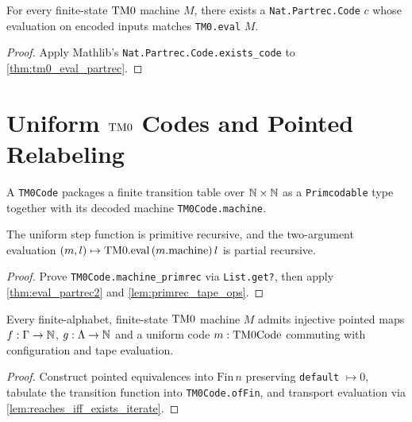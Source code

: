 \begin{corollary}
  \label{cor:exists_code_eval}
  \leanok
  For every finite-state $\mathrm{TM0}$ machine $M$, there exists a \texttt{Nat.Partrec.Code} $c$ whose evaluation on encoded inputs matches \texttt{TM0.eval} $M$.
\end{corollary}
\begin{proof}
  \leanok
  Apply Mathlib's \texttt{Nat.Partrec.Code.exists\_code} to \ref{thm:tm0_eval_partrec}.
\end{proof}

\chapter{Uniform $\mathrm{TM0}$ Codes and Pointed Relabeling}

\begin{definition}
  \label{def:tm0Code}
  \leanok
  A \texttt{TM0Code} packages a finite transition table over $\mathbb{N} \times \mathbb{N}$ as a \texttt{Primcodable} type together with its decoded machine \texttt{TM0Code.machine}.
\end{definition}

\begin{theorem}
  \label{thm:tm0Code_eval_partrec}
  \leanok
  The uniform step function is primitive recursive, and the two-argument evaluation $(m, l) \mapsto \mathrm{TM0}.\mathrm{eval}\,(m.\mathrm{machine})\,l$ is partial recursive.
\end{theorem}
\begin{proof}
  \leanok
  Prove \texttt{TM0Code.machine\_primrec} via \texttt{List.get?}, then apply \ref{thm:eval_partrec2} and \ref{lem:primrec_tape_ops}.
\end{proof}

\begin{theorem}
  \label{thm:exists_relabeling}
  \leanok
  Every finite-alphabet, finite-state $\mathrm{TM0}$ machine $M$ admits injective pointed maps $f : \Gamma \to \mathbb{N}$, $g : \Lambda \to \mathbb{N}$ and a uniform code $m : \mathrm{TM0Code}$ commuting with configuration and tape evaluation.
\end{theorem}
\begin{proof}
  \leanok
  Construct pointed equivalences into $\mathrm{Fin}\,n$ preserving \texttt{default} $\mapsto 0$, tabulate the transition function into \texttt{TM0Code.ofFin}, and transport evaluation via \ref{lem:reaches_iff_exists_iterate}.
\end{proof}

